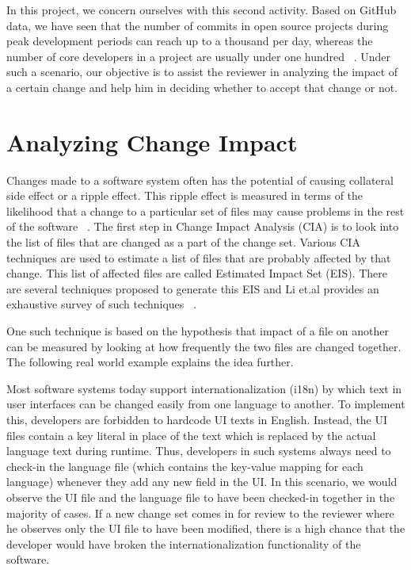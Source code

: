 In this project, we concern ourselves with this second activity. Based on GitHub data, we have seen that the number of commits in open source projects during peak development periods can reach up to a thousand per day, whereas the number of core developers in a project are usually under one hundred ~\cite{YoshikawaIS14}. Under such a scenario, our objective is to assist the reviewer in analyzing the impact of a certain change and help him in deciding whether to accept that change or not.\\

\section{Analyzing Change Impact}

Changes made to a software system often has the potential of causing collateral side effect or a ripple effect. This ripple effect is measured in terms of the likelihood that a change to a particular set of files may cause problems in the rest of the software ~\cite{STVSTVR1475}. The first step in Change Impact Analysis (CIA) is to look into the list of files that are changed as a part of the change set. Various CIA techniques are used to estimate a list of files that are probably affected by that change. This list of affected files are called Estimated Impact Set (EIS). There are several techniques proposed to generate this EIS and Li et.al provides an exhaustive survey of such techniques ~\cite{STVSTVR1475}.

One such technique is based on the hypothesis that impact of a file on another can be measured by looking at how frequently the two files are changed together. The following real world example explains the idea further.

Most software systems today support internationalization (i18n) by which text in user interfaces can be changed easily from one language to another. To implement this, developers are forbidden to hardcode UI texts in English. Instead, the UI files contain a key literal in place of the text which is replaced by the actual language text during runtime. Thus, developers in such systems always need to check-in the language file (which contains the key-value mapping for each language) whenever they add any new field in the UI. In this scenario, we would observe the UI file and the language file to have been checked-in together in the majority of cases. If a new change set comes in for review to the reviewer where he observes only the UI file to have been modified, there is a high chance that the developer would have broken the internationalization functionality of the software.

